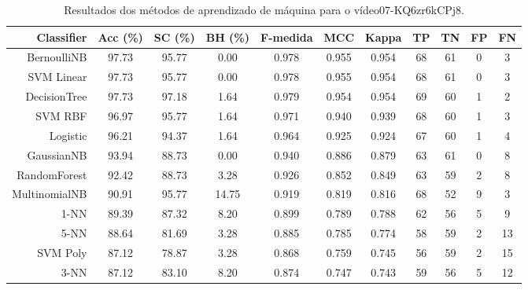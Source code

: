 \begin{table}[!htb]
\centering
\caption{Resultados dos métodos de aprendizado de máquina para o vídeo07-KQ6zr6kCPj8.}
\label{tab:07-KQ6zr6kCPj8}
\begin{tabular}{r|c|c|c|c|c|c|c|c|c|c}
\hline\hline
Classifier & Acc (\%) & SC (\%) & BH (\%) & F-medida & MCC & Kappa & TP & TN & FP & FN \\ \hline
BernoulliNB & 97.73 & 95.77 & 0.00 & 0.978 & 0.955 & 0.954 & 68 & 61 & 0 & 3 \\ 
SVM Linear & 97.73 & 95.77 & 0.00 & 0.978 & 0.955 & 0.954 & 68 & 61 & 0 & 3 \\ 
DecisionTree & 97.73 & 97.18 & 1.64 & 0.979 & 0.954 & 0.954 & 69 & 60 & 1 & 2 \\ 
SVM RBF & 96.97 & 95.77 & 1.64 & 0.971 & 0.940 & 0.939 & 68 & 60 & 1 & 3 \\ 
Logistic & 96.21 & 94.37 & 1.64 & 0.964 & 0.925 & 0.924 & 67 & 60 & 1 & 4 \\ 
GaussianNB & 93.94 & 88.73 & 0.00 & 0.940 & 0.886 & 0.879 & 63 & 61 & 0 & 8 \\ 
RandomForest & 92.42 & 88.73 & 3.28 & 0.926 & 0.852 & 0.849 & 63 & 59 & 2 & 8 \\ 
MultinomialNB & 90.91 & 95.77 & 14.75 & 0.919 & 0.819 & 0.816 & 68 & 52 & 9 & 3 \\ 
1-NN & 89.39 & 87.32 & 8.20 & 0.899 & 0.789 & 0.788 & 62 & 56 & 5 & 9 \\ 
5-NN & 88.64 & 81.69 & 3.28 & 0.885 & 0.785 & 0.774 & 58 & 59 & 2 & 13 \\ 
SVM Poly & 87.12 & 78.87 & 3.28 & 0.868 & 0.759 & 0.745 & 56 & 59 & 2 & 15 \\ 
3-NN & 87.12 & 83.10 & 8.20 & 0.874 & 0.747 & 0.743 & 59 & 56 & 5 & 12 \\ 
\hline\hline
\end{tabular}
\end{table}
